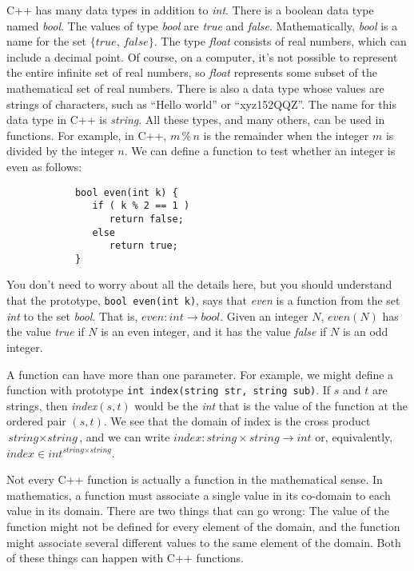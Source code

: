 C++ has many data types in addition to \textit{int}.  There is
a boolean data type named \textit{bool}.  The values of type
\textit{bool} are \textit{true} and \textit{false}.  Mathematically,
\textit{bool} is a name for the set $\{\textit{true},\,\textit{false}\}$.
The type \textit{float} consists of real numbers, which can
include a decimal point.  Of course, on a computer, it's not
possible to represent the entire infinite set of real numbers,
so \textit{float} represents some subset of the mathematical set
of real numbers.  There is also a data type whose values are
strings of characters, such as ``Hello world'' or ``xyz152QQZ''.
The name for this data type in C++ is \textit{string}.  All these
types, and many others, can be used in functions.  For example,
in C++, $m\,\%\,n$ is the remainder when the integer $m$ is
divided by the integer $n$.  We can define a function to test
whether an integer is even as follows:
\begin{verbatim}
            bool even(int k) {
               if ( k % 2 == 1 )
                  return false;
               else
                  return true;
            }
\end{verbatim}
You don't need to worry about all the details here, but you should
understand that the prototype, \verb=bool even(int k)=,
says that \textit{even} is a function from the set \textit{int}
to the set \textit{bool}.  That is,
$\textit{even}\colon\textit{int}\to\textit{bool}$.  Given
an integer $N$, $\textit{even}(N)$ has the value \textit{true}
if $N$ is an even integer, and it has the value \textit{false}
if $N$ is an odd integer.

A function can have more than one parameter.  For example, we might
define a function with prototype \verb=int index(string str, string sub)=.
If $s$ and $t$ are strings, then \textit{index}$(s,t)$ would be the
\textit{int} that is the value of the function at the ordered pair
$(s,t)$.  We see that the domain of index is the cross product
$\textit{string}\times\textit{string}$, and we can write
$\textit{index}\colon \textit{string}\times\textit{string}\to\textit{int}$
or, equivalently, $\textit{index}\in\textit{int}^{\textit{string}\times\textit{string}}$.

\medbreak

Not every C++ function is actually a function in the mathematical
sense.  In mathematics, a function must associate a single value in
its co-domain to each value in its domain.  There are two things
that can go wrong:  The value of the function might not be defined
for every element of the domain, and the function might associate
several different values to the same element of the domain.
Both of these things can happen with C++ functions.

